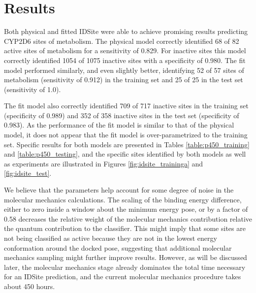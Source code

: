 \section{Results}
\label{section:p450/results}
Both physical and fitted IDSite were able to achieve promising results predicting CYP2D6 sites of metabolism.
The physical model correctly identified 68 of 82 active sites of metabolism for a sensitivity of 0.829.
For inactive sites this model correctly identified 1054 of 1075 inactive sites with a specificity of 0.980.
The fit model performed similarly, and even slightly better, identifying 52 of 57 sites of metabolism (sensitivity of 0.912) in the training set and 25 of 25 in the test set (sensitivity of 1.0).




The fit model also correctly identified 709 of 717 inactive sites in the training set (specificity of 0.989) and 352 of 358 inactive sites in the test set (specificity of 0.983).
As the performance of the fit model is similar to that of the physical model, it does not appear that the fit model is over-parametrized to the training set.
Specific results for both models are presented in Tables \ref{table:p450_training} and \ref{table:p450_testing}, and the specific sites identified by both models as well as experiments are illustrated in Figures \ref{fig:idsite_traininga} and \ref{fig:idsite_test}. 

We believe that the parameters help account for some degree of noise in the molecular mechanics calculations.
The scaling of the binding energy difference, either to zero inside a window about the minimum energy pose, or by a factor of 0.58 decreases the relative weight of the molecular mechanics contribution relative the quantum contribution to the classifier.
This might imply that some sites are not being classified as active because they are not in the lowest energy conformation around the docked pose, suggesting that additional molecular mechanics sampling might further improve results.
However, as will be discussed later, the molecular mechanics stage already dominates the total time necessary for an IDSite prediction, and the current molecular mechanics procedure takes about 450 hours.




